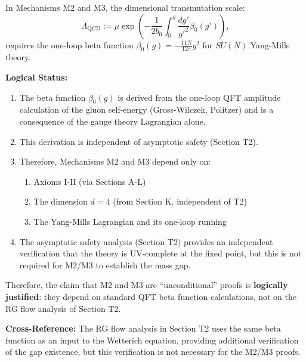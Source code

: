 \begin{remark}
\label{rem:betaFunctionSource}

In Mechanisms M2 and M3, the dimensional transmutation scale:
\begin{equation}
\Lambda_{\mathrm{QCD}} := \mu \exp\left(-\frac{1}{2b_0} \int_0^g \frac{dg'}{g'^2} \beta_0(g')\right),
\end{equation}
requires the one-loop beta function $\beta_0(g) = -\frac{11N}{12\pi} g^2$ for $SU(N)$ Yang-Mills theory.

\textbf{Logical Status:}
\begin{enumerate}
\item The beta function $\beta_0(g)$ is derived from the one-loop QFT amplitude calculation of the gluon self-energy (Gross-Wilczek, Politzer) and is a consequence of the gauge theory Lagrangian alone.
\item This derivation is independent of asymptotic safety (Section T2).
\item Therefore, Mechanisms M2 and M3 depend only on:
\begin{enumerate}
\item Axioms I-II (via Sections A-L)
\item The dimension $d = 4$ (from Section K, independent of T2)
\item The Yang-Mills Lagrangian and its one-loop running
\end{enumerate}
\item The asymptotic safety analysis (Section T2) provides an independent verification that the theory is UV-complete at the fixed point, but this is not required for M2/M3 to establish the mass gap.
\end{enumerate}

Therefore, the claim that M2 and M3 are ``unconditional'' proofs is \textbf{logically justified}: they depend on standard QFT beta function calculations, not on the RG flow analysis of Section T2.

\textbf{Cross-Reference:}
The RG flow analysis in Section T2 uses the same beta function as an input to the Wetterich equation, providing additional verification of the gap existence, but this verification is not necessary for the M2/M3 proofs.

\end{remark}

